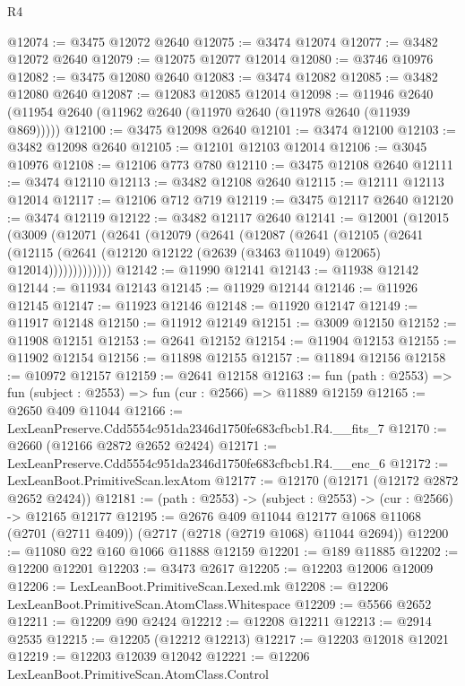 \begin{lexlean}{R4}
\begin{coremodule}
@12074 := @3475 @12072 @2640
@12075 := @3474 @12074
@12077 := @3482 @12072 @2640
@12079 := @12075 @12077 @12014
@12080 := @3746 @10976
@12082 := @3475 @12080 @2640
@12083 := @3474 @12082
@12085 := @3482 @12080 @2640
@12087 := @12083 @12085 @12014
@12098 := @11946 @2640 (@11954 @2640 (@11962 @2640 (@11970 @2640 (@11978 @2640 (@11939 @869)))))
@12100 := @3475 @12098 @2640
@12101 := @3474 @12100
@12103 := @3482 @12098 @2640
@12105 := @12101 @12103 @12014
@12106 := @3045 @10976
@12108 := @12106 @773 @780
@12110 := @3475 @12108 @2640
@12111 := @3474 @12110
@12113 := @3482 @12108 @2640
@12115 := @12111 @12113 @12014
@12117 := @12106 @712 @719
@12119 := @3475 @12117 @2640
@12120 := @3474 @12119
@12122 := @3482 @12117 @2640
@12141 := @12001
    (@12015
      (@3009
        (@12071
          (@2641
            (@12079
              (@2641
                (@12087
                  (@2641
                    (@12105
                      (@2641
                        (@12115
                          (@2641 (@12120 @12122 (@2639 (@3463 @11049) @12065) @12014)))))))))))))
@12142 := @11990 @12141
@12143 := @11938 @12142
@12144 := @11934 @12143
@12145 := @11929 @12144
@12146 := @11926 @12145
@12147 := @11923 @12146
@12148 := @11920 @12147
@12149 := @11917 @12148
@12150 := @11912 @12149
@12151 := @3009 @12150
@12152 := @11908 @12151
@12153 := @2641 @12152
@12154 := @11904 @12153
@12155 := @11902 @12154
@12156 := @11898 @12155
@12157 := @11894 @12156
@12158 := @10972 @12157
@12159 := @2641 @12158
@12163 := fun (path : @2553) => fun (subject : @2553) => fun (cur : @2566) => @11889 @12159
@12165 := @2650 @409 @11044
@12166 := LexLeanPreserve.Cdd5554c951da2346d1750fe683cfbcb1.R4.__fits_7
@12170 := @2660 (@12166 @2872 @2652 @2424)
@12171 := LexLeanPreserve.Cdd5554c951da2346d1750fe683cfbcb1.R4.__enc_6
@12172 := LexLeanBoot.PrimitiveScan.lexAtom
@12177 := @12170 (@12171 (@12172 @2872 @2652 @2424))
@12181 := (path : @2553) -> (subject : @2553) -> (cur : @2566) -> @12165 @12177
@12195 := @2676
    @409
    @11044
    @12177
    @1068
    @11068
    (@2701 (@2711 @409))
    (@2717 (@2718 (@2719 @1068) @11044 @2694))
@12200 := @11080 @22 @160 @1066 @11888 @12159
@12201 := @189 @11885
@12202 := @12200 @12201
@12203 := @3473 @2617
@12205 := @12203 @12006 @12009
@12206 := LexLeanBoot.PrimitiveScan.Lexed.mk
@12208 := @12206 LexLeanBoot.PrimitiveScan.AtomClass.Whitespace
@12209 := @5566 @2652
@12211 := @12209 @90 @2424
@12212 := @12208 @12211
@12213 := @2914 @2535
@12215 := @12205 (@12212 @12213)
@12217 := @12203 @12018 @12021
@12219 := @12203 @12039 @12042
@12221 := @12206 LexLeanBoot.PrimitiveScan.AtomClass.Control

\end{coremodule}
\end{lexlean}
